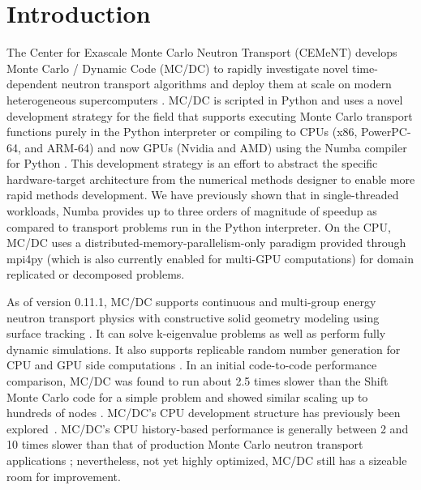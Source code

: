 \section{Introduction}\label{sec:1}

The Center for Exascale Monte Carlo Neutron Transport (CEMeNT) develops Monte Carlo / Dynamic Code (MC/DC) to rapidly investigate novel time-dependent neutron transport algorithms and deploy them at scale on modern heterogeneous supercomputers \cite{morgan_monte_2024}.
MC/DC is scripted in Python and uses a novel development strategy for the field that supports executing Monte Carlo transport functions purely in the Python interpreter or compiling to CPUs (x86, PowerPC-64, and ARM-64) \cite{variansyah_mc23_mcdc} and now GPUs (Nvidia and AMD) using the Numba compiler for Python \cite{lam_numba_2015}.
This development strategy is an effort to abstract the specific hardware-target architecture from the numerical methods designer to enable more rapid methods development.
We have previously shown that in single-threaded workloads, Numba provides up to three orders of magnitude of speedup as compared to transport problems run in the Python interpreter.
On the CPU, MC/DC uses a distributed-memory-parallelism-only paradigm provided through mpi4py \cite{dalcin_mpi4py_2021} (which is also currently enabled for multi-GPU computations) for domain replicated or decomposed problems.

As of version 0.11.1, MC/DC supports continuous and multi-group energy neutron transport physics with constructive solid geometry modeling using surface tracking \cite{transport_cement_mcdc_2024}.
It can solve k-eigenvalue problems as well as perform fully dynamic simulations.
It also supports replicable random number generation for CPU and GPU side computations \cite{rngseed}.
In an initial code-to-code performance comparison, MC/DC was found to run about 2.5 times slower than the Shift Monte Carlo code for a simple problem and showed similar scaling up to hundreds of nodes \cite{variansyah_mc23_mcdc}.
MC/DC's CPU development structure has previously been explored~\cite{morgan_monte_2024, variansyah_mc23_mcdc, morgan2022}.
MC/DC's CPU history-based performance is generally between 2 and 10 times slower than that of production Monte Carlo neutron transport applications \cite{variansyah_mc23_mcdc}; nevertheless, not yet highly optimized, MC/DC still has a sizeable room for improvement.


